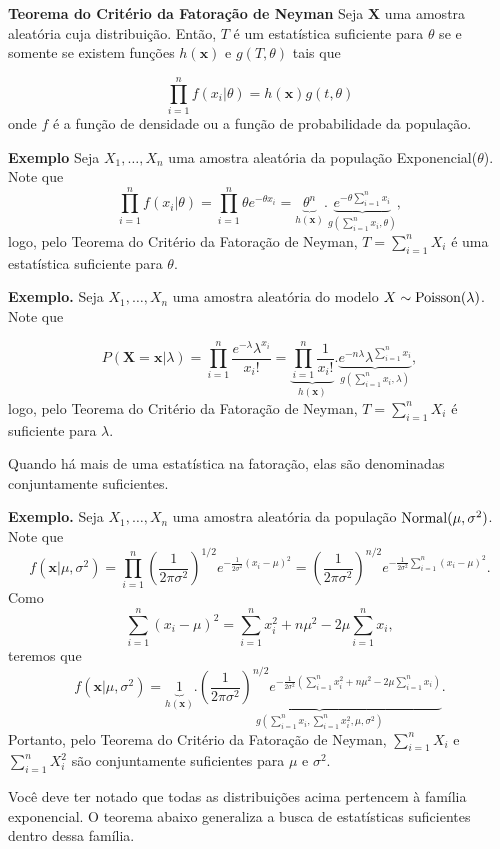 \documentclass[
  letterpaper,
  DIV=11,
  numbers=noendperiod]{scrartcl}
\begin{document}
\textbf{Teorema do Critério da Fatoração de Neyman} Seja \(\textbf{X}\)
uma amostra aleatória cuja distribuição. Então, \(T\) é um estatística
suficiente para \(\theta\) se e somente se existem funções
\(h(\textbf{x})\) e \(g(T,\theta)\) tais que

\[\prod_{i=1}^nf(x_i|\theta)=h(\textbf{x})g(t,\theta)\] onde \(f\) é a
função de densidade ou a função de probabilidade da população.

\textbf{Exemplo} Seja \(X_1,\ldots,X_n\) uma amostra aleatória da
população Exponencial(\(\theta\)). Note que
\[\prod_{i=1}^n  f(x_i|\theta)=\prod_{i=1}^n \theta e^{-\theta x_i}=\underbrace{\theta^n}_{h(\textbf{x})}. \underbrace{e^{-\theta\sum_{i=1}^n x_i}}_{g(\sum_{i=1}^n x_i,\theta)},\]
logo, pelo Teorema do Critério da Fatoração de Neyman,
\(T=\sum_{i=1}^{n}X_i\) é uma estatística suficiente para \(\theta\).

\textbf{Exemplo.} Seja \(X_1,\ldots,X_n\) uma amostra aleatória do
modelo \(X\sim\hbox{Poisson}(\lambda)\). Note que

\[P(\textbf{X}=\textbf{x}|\lambda)=\prod_{i=1}^n\frac{e^{-\lambda}\lambda^{x_i}}{x_i!}=\underbrace{\prod_{i=1}^n\frac{1}{x_i!}}_{h(\textbf{x})}.\underbrace{e^{-n\lambda}\lambda^{\sum_{i=1}^n x_i}}_{g(\sum_{i=1}^n x_i,\lambda)},\]
logo, pelo Teorema do Critério da Fatoração de Neyman,
\(T=\sum_{i=1}^n X_i\) é suficiente para \(\lambda\).

Quando há mais de uma estatística na fatoração, elas são denominadas
conjuntamente suficientes.

\textbf{Exemplo.} Seja \(X_1,\ldots,X_n\) uma amostra aleatória da
população \(\hbox{Normal}(\mu,\sigma^2)\). Note que
\[f(\textbf{x}|\mu,\sigma^2)=\prod_{i=1}^n\left(\frac{1}{2\pi\sigma^2}\right)^{1/2} e^{-\frac{1}{2\sigma^2}(x_i-\mu)^2}=\left(\frac{1}{2\pi\sigma^2}\right)^{n/2} e^{-\frac{1}{2\sigma^2}\sum_{i=1}^n(x_i-\mu)^2}.\]
Como
\[\sum_{i=1}^n(x_i-\mu)^2=\sum_{i=1}^n x_i^2 +n\mu^2-2\mu\sum_{i=1}^n x_i,\]
teremos que
\[f(\textbf{x}|\mu,\sigma^2)=\underbrace{1}_{h(\textbf{x})}.\underbrace{\left(\frac{1}{2\pi\sigma^2}\right)^{n/2} e^{-\frac{1}{2\sigma^2}\left(\sum_{i=1}^n x_i^2 +n\mu^2-2\mu\sum_{i=1}^n x_i\right)}}_{g( \sum_{i=1}^n x_{i},\sum_{i=1}^n x_i^2,\mu,\sigma^2)}.\]
Portanto, pelo Teorema do Critério da Fatoração de Neyman,
\(\sum_{i=1}^nX_i\) e \(\sum_{i=1}^n X_i^2\) são conjuntamente
suficientes para \(\mu\) e \(\sigma^2\).

Você deve ter notado que todas as distribuições acima pertencem à
família exponencial. O teorema abaixo generaliza a busca de estatísticas
suficientes dentro dessa família.
\end{document}
